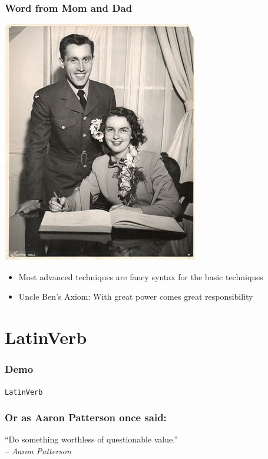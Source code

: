 \documentclass[slidestop,compress,mathserif]{beamer}
\begin{document}
\begin{frame}
	\frametitle{Word from Mom and Dad}
	\begin{center}
		\includegraphics[scale=0.35]{img/MomDadMarried50s.jpeg}
	\end{center}
	\pause
	\begin{itemize}
		\item Most advanced techniques are fancy syntax for the basic techniques
		\pause
		\item Uncle Ben's Axiom:  With great power comes great responsibility
	\end{itemize}	
\end{frame}

\section{LatinVerb} %
\label{sub:_modeling_thought_in_latinverb}

\begin{frame}
	\frametitle{Demo}
	\begin{center}
		\texttt{LatinVerb}
	\end{center}
\end{frame}

\begin{frame}
	\frametitle{Or as Aaron Patterson once said:}
	\begin{center}
		``Do something worthless of questionable value.'' \\ -- \emph{Aaron Patterson}
	\end{center}
\end{frame}
\end{document}
